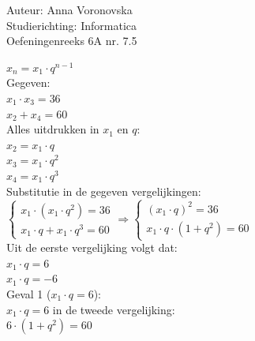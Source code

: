 \documentclass[a4paper]{article}
\begin{document}
  
\noindent \large Auteur: Anna Voronovska \\
\noindent \large Studierichting: Informatica\\
\noindent \large Oefeningenreeks 6A nr. 7.5\\

\medskip

\normalsize

$x_n = x_1 \cdot q^{n-1}$\\

Gegeven:\\

$x_1 \cdot x_3 = 36$\\

$x_2 + x_4 = 60$\\

Alles uitdrukken in $x_1$ en $q$:\\

$x_2 = x_1 \cdot q$\\

$x_3 = x_1 \cdot q^2$\\

$x_4 = x_1 \cdot q^3$\\

Substitutie in de gegeven vergelijkingen:\\

$\left\{ \begin{array}{l}
    x_1 \cdot (x_1 \cdot q^2) = 36 \\
    x_1 \cdot q + x_1 \cdot q^3 = 60
\end{array} \right.
\Rightarrow
\left\{ \begin{array}{l}
    (x_1 \cdot q)^2 = 36 \\
    x_1 \cdot q \cdot (1 + q^2) = 60
\end{array} \right.
$\\

Uit de eerste vergelijking volgt dat:\\ 

$x_1 \cdot q = 6$\\

$x_1 \cdot q = -6$\\

Geval 1 ($x_1 \cdot q = 6$):\\

$x_1 \cdot q = 6$ in de tweede vergelijking:\\

$6 \cdot (1 + q^2) = 60$\\
\end{document}
